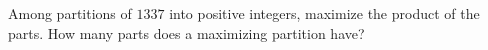 Among partitions of $1337$ into positive integers, maximize the product of the parts. How many parts does a maximizing partition have?
